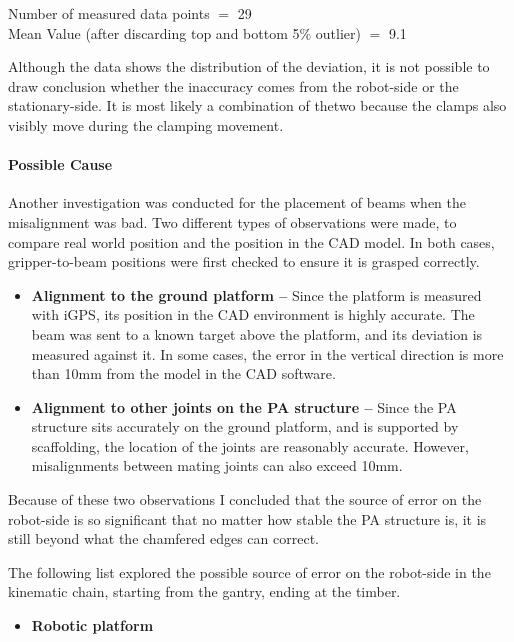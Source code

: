 {

{\footnotesize Number of measured data points $=$ 29 \\ Mean Value (after discarding top and bottom 5$\%$ outlier) $=$ 9.1}

Although the data shows the distribution of the deviation, it is not possible to draw conclusion whether the inaccuracy comes from the robot-side or the stationary-side. It is most likely a combination of thetwo because the clamps also visibly move during the clamping movement. 

\paragraph{Possible Cause}

Another investigation was conducted for the placement of beams when the misalignment was bad. Two different types of observations were made, to compare real world position and the position in the CAD model. In both cases, gripper-to-beam positions were first checked to ensure it is grasped correctly.

\begin{itemize}
	\item \textbf{Alignment to the ground platform --} Since the platform is measured with iGPS, its position in the CAD environment is highly accurate. The beam was sent to a known target above the platform, and its deviation is measured against it. In some cases, the error in the vertical direction is more than 10mm from the model in the CAD software. 

	\item \textbf{Alignment to other joints on the PA structure --} Since the PA structure sits accurately on the ground platform, and is supported by scaffolding, the location of the joints are reasonably accurate. However, misalignments between mating joints can also exceed 10mm. 

\end{itemize}
Because of these two observations I concluded that the source of error on the robot-side is so significant that no matter how stable the PA structure is, it is still beyond what the chamfered edges can correct. 

The following list explored the possible source of error on the robot-side in the kinematic chain, starting from the gantry, ending at the timber.

\begin{itemize}
	\item \textbf{Robotic platform}


\end{itemize}}
